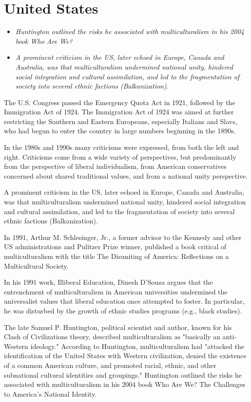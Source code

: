 \section{United States}\label{united-states}

\begin{itemize}
\item
  \emph{Huntington outlined the risks he associated with
  multiculturalism in his 2004 book Who Are We?}
\item
  \emph{A prominent criticism in the US, later echoed in Europe, Canada
  and Australia, was that multiculturalism undermined national unity,
  hindered social integration and cultural assimilation, and led to the
  fragmentation of society into several ethnic factions
  (Balkanization).}
\end{itemize}

The U.S. Congress passed the Emergency Quota Act in 1921, followed by
the Immigration Act of 1924. The Immigration Act of 1924 was aimed at
further restricting the Southern and Eastern Europeans, especially
Italians and Slavs, who had begun to enter the country in large numbers
beginning in the 1890s.

In the 1980s and 1990s many criticisms were expressed, from both the
left and right. Criticisms come from a wide variety of perspectives, but
predominantly from the perspective of liberal individualism, from
American conservatives concerned about shared traditional values, and
from a national unity perspective.

A prominent criticism in the US, later echoed in Europe, Canada and
Australia, was that multiculturalism undermined national unity, hindered
social integration and cultural assimilation, and led to the
fragmentation of society into several ethnic factions (Balkanization).

In 1991, Arthur M. Schlesinger, Jr., a former advisor to the Kennedy and
other US administrations and Pulitzer Prize winner, published a book
critical of multiculturalism with the title The Disuniting of America:
Reflections on a Multicultural Society.

In his 1991 work, Illiberal Education, Dinesh D'Souza argues that the
entrenchment of multiculturalism in American universities undermined the
universalist values that liberal education once attempted to foster. In
particular, he was disturbed by the growth of ethnic studies programs
(e.g., black studies).

The late Samuel P. Huntington, political scientist and author, known for
his Clash of Civilizations theory, described multiculturalism as
"basically an anti-Western ideology." According to Huntington,
multiculturalism had "attacked the identification of the United States
with Western civilization, denied the existence of a common American
culture, and promoted racial, ethnic, and other subnational cultural
identities and groupings." Huntington outlined the risks he associated
with multiculturalism in his 2004 book Who Are We? The Challenges to
America's National Identity.

